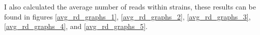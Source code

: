 \documentclass[../main.tex]{subfiles}
\begin{document}
I also calculated the average number of reads within strains, these results can be found in figures \ref{avg_rd_graphs_1}, \ref{avg_rd_graphs_2}, \ref{avg_rd_graphs_3}, \ref{avg_rd_graphs_4}, and \ref{avg_rd_graphs_5}. 

\begin{figure}[H]
	\begin{centering}
		\vspace{-1.5cm}
		\\

\end{centering}
\end{figure}
\end{document}
